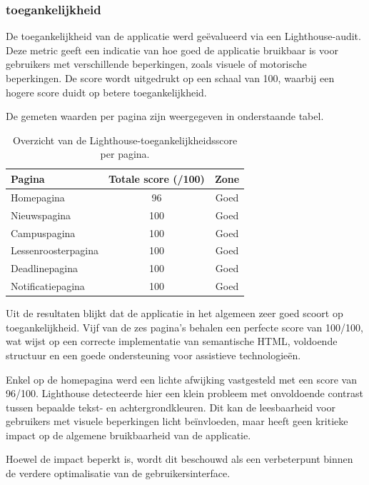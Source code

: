 \subsubsection{toegankelijkheid}

De toegankelijkheid van de applicatie werd geëvalueerd via een Lighthouse-audit. Deze metric geeft een indicatie van hoe goed de applicatie bruikbaar is voor gebruikers met verschillende beperkingen, zoals visuele of motorische beperkingen. De score wordt uitgedrukt op een schaal van 100, waarbij een hogere score duidt op betere toegankelijkheid.

De gemeten waarden per pagina zijn weergegeven in onderstaande tabel.

\begin{table}[h]
\centering
\caption[Toegankelijkheidsscore per pagina]{Overzicht van de Lighthouse-toegankelijkheidsscore per pagina.}
\label{tab:toegankelijkheid-score-per-pagina}
\begin{tabular}{lcc}
\hline
\textbf{Pagina} & \textbf{Totale score (/100)} & \textbf{Zone} \\
\hline
Homepagina & 96 & Goed \\
Nieuwspagina & 100 & Goed \\
Campuspagina & 100 & Goed \\
Lessenroosterpagina & 100 & Goed \\
Deadlinepagina & 100 & Goed \\
Notificatiepagina & 100 & Goed \\
\hline
\end{tabular}
\end{table}

Uit de resultaten blijkt dat de applicatie in het algemeen zeer goed scoort op toegankelijkheid. Vijf van de zes pagina's behalen een perfecte score van 100/100, wat wijst op een correcte implementatie van semantische HTML, voldoende structuur en een goede ondersteuning voor assistieve technologieën.

Enkel op de homepagina werd een lichte afwijking vastgesteld met een score van 96/100. Lighthouse detecteerde hier een klein probleem met onvoldoende contrast tussen bepaalde tekst- en achtergrondkleuren. Dit kan de leesbaarheid voor gebruikers met visuele beperkingen licht beïnvloeden, maar heeft geen kritieke impact op de algemene bruikbaarheid van de applicatie.

Hoewel de impact beperkt is, wordt dit beschouwd als een verbeterpunt binnen de verdere optimalisatie van de gebruikersinterface.

